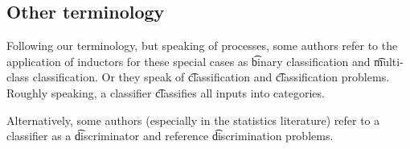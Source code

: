 \subsection*{Other terminology}

Following our terminology, but speaking of processes, some authors refer to the application of inductors for these special cases as \t{binary classification} and \t{multi-class classification}.
Or they speak of \t{classification} and \t{classification problems}.
Roughly speaking, a classifier \t{classifies} all inputs into categories.

Alternatively, some authors (especially in the statistics literature) refer to a classifier as a \t{discriminator} and reference \t{discrimination problems}.

